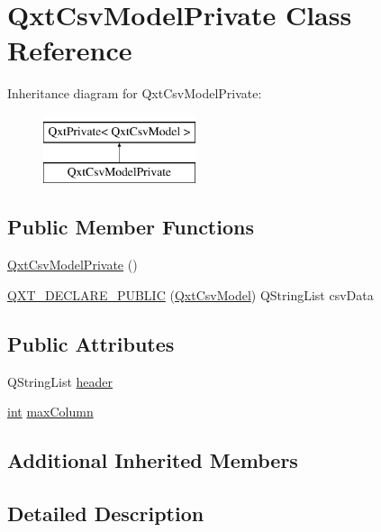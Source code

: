 \hypertarget{class_qxt_csv_model_private}{\section{Qxt\-Csv\-Model\-Private Class Reference}
\label{class_qxt_csv_model_private}
}
Inheritance diagram for Qxt\-Csv\-Model\-Private\-:\begin{figure}[H]
\begin{center}
\leavevmode
\includegraphics[height=2.000000cm]{class_qxt_csv_model_private}
\end{center}
\end{figure}
\subsection*{Public Member Functions}
\begin{DoxyCompactItemize}
\item 
\hyperlink{class_qxt_csv_model_private_a07dcd2aeee4329b16c934e51791cd665}{Qxt\-Csv\-Model\-Private} ()
\item 
\hyperlink{class_qxt_csv_model_private_a4ba8eb6bf5f04278c713fbff442ae849}{Q\-X\-T\-\_\-\-D\-E\-C\-L\-A\-R\-E\-\_\-\-P\-U\-B\-L\-I\-C} (\hyperlink{class_qxt_csv_model}{Qxt\-Csv\-Model}) Q\-String\-List csv\-Data
\end{DoxyCompactItemize}
\subsection*{Public Attributes}
\begin{DoxyCompactItemize}
\item 
Q\-String\-List \hyperlink{class_qxt_csv_model_private_add6903d5c736a84fc6bc2962a367d088}{header}
\item 
\hyperlink{ioapi_8h_a787fa3cf048117ba7123753c1e74fcd6}{int} \hyperlink{class_qxt_csv_model_private_a5a785e4ff82f75bac941fbf917439224}{max\-Column}
\end{DoxyCompactItemize}
\subsection*{Additional Inherited Members}


\subsection{Detailed Description}


